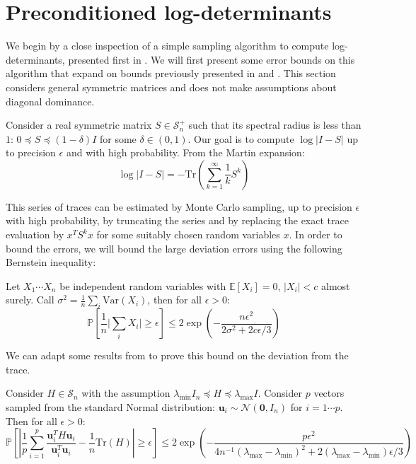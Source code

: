 
\section{Preconditioned log-determinants\label{sec:Preconditioned-log-determinants}}

We begin by a close inspection of a simple sampling algorithm to compute
log-determinants, presented first in \cite{Barry1999}. We will first
present some error bounds on this algorithm that expand on bounds
previously presented in \cite{Bai1996} and \cite{Barry1999}. This
section considers general symmetric matrices and does not make assumptions
about diagonal dominance.

Consider a real symmetric matrix $S\in\mathcal{S}_{n}^{+}$ such that
its spectral radius is less than $1$: $0\preceq S\preceq\left(1-\delta\right)I$
for some $\delta\in\left(0,1\right)$. Our goal is to compute $\log\left|I-S\right|$
up to precision $\epsilon$ and with high probability. From the Martin
expansion: 
\begin{equation}
\log\left|I-S\right|=-\mbox{Tr}\left(\sum_{k=1}^{\infty}\frac{1}{k}S^{k}\right)\label{eq:martin}
\end{equation}


This series of traces can be estimated by Monte Carlo sampling, up
to precision $\epsilon$ with high probability, by truncating the
series and by replacing the exact trace evaluation by $x^{T}S^{k}x$
for some suitably chosen random variables $x$. In order to bound
the errors, we will bound the large deviation errors using the following
Bernstein inequality:

\begin{lemma} \label{lem:bernstein} Let $X_{1}\cdots X_{n}$ be independent
random variables with $\mathbb{E}\left[X_{i}\right]=0$, $\left|X_{i}\right|<c$ almost surely.
Call $\sigma^{2}=\frac{1}{n}\sum_{i}\text{Var}\left(X_{i}\right)$,
then for all $\epsilon>0$: 
\[
\mathbb{P}\left[\frac{1}{n}\Big|\sum_{i}X_{i}\Big|\geq\epsilon\right] \leq 2\exp\left(-\frac{n\epsilon^{2}}{2\sigma^{2}+2c\epsilon/3}\right)
\]
\end{lemma}

We can adapt some results from \cite{Barry1999} to prove this bound on the deviation from the
trace.

\begin{lemma} \label{lem:bernstein-trace}Consider $H\in\mathcal{S}_{n}$
with the assumption $\lambda_{\text{min}}I_{n}\preceq H\preceq\lambda_{\text{max}}I$.
Consider $p$ vectors sampled from the standard Normal distribution:
$\mathbf{u}_{i}\sim\mathcal{N}\left(\mathbf{0},I_{n}\right)$ for
$i=1\cdots p$. Then for all $\epsilon>0$: 
\[
\mathbb{P}\left[\left|\frac{1}{p}\sum_{i=1}^{p}\frac{\mathbf{u}_{i}^{T}H\mathbf{u}_{i}}{\mathbf{u}_{i}^{T}\mathbf{u}_{i}}-\frac{1}{n}\mbox{Tr}\left(H\right)\right|\geq\epsilon\right] \leq 2\exp\left(-\frac{p\epsilon^{2}}{4n^{-1}\left(\lambda_{\max}-\lambda_{\min}\right)^{2}+2\left(\lambda_{\max}-\lambda_{\min}\right)\epsilon/3}\right)
\]
\end{lemma} 

